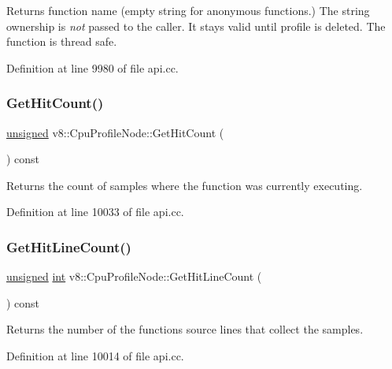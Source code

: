 Returns function name (empty string for anonymous functions.) The string ownership is {\itshape not} passed to the caller. It stays valid until profile is deleted. The function is thread safe. 

Definition at line 9980 of file api.\+cc.

\mbox{\label{classv8_1_1CpuProfileNode_a56d1cece4ee808022b9eb7f3eb66b93a}} 
\subsubsection{\texorpdfstring{Get\+Hit\+Count()}{GetHitCount()}}
{\footnotesize\ttfamily \mbox{\hyperlink{classunsigned}{unsigned}} v8\+::\+Cpu\+Profile\+Node\+::\+Get\+Hit\+Count (\begin{DoxyParamCaption}{ }\end{DoxyParamCaption}) const}

Returns the count of samples where the function was currently executing. 

Definition at line 10033 of file api.\+cc.

\mbox{\label{classv8_1_1CpuProfileNode_a5b956d1b3aea5a9710632b28b1e85dfd}} 
\subsubsection{\texorpdfstring{Get\+Hit\+Line\+Count()}{GetHitLineCount()}}
{\footnotesize\ttfamily \mbox{\hyperlink{classunsigned}{unsigned}} \mbox{\hyperlink{classint}{int}} v8\+::\+Cpu\+Profile\+Node\+::\+Get\+Hit\+Line\+Count (\begin{DoxyParamCaption}{ }\end{DoxyParamCaption}) const}

Returns the number of the function\textquotesingle{}s source lines that collect the samples. 

Definition at line 10014 of file api.\+cc.

\mbox{\label{classv8_1_1CpuProfileNode_a6616c8d1893da19183d57e6488eb2743}} 
